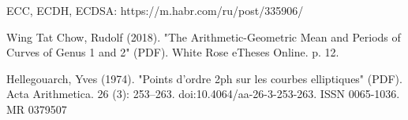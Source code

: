 \begin{thebibliography}{99}

ECC, ECDH, ECDSA: https://m.habr.com/ru/post/335906/

 Wing Tat Chow, Rudolf (2018). "The Arithmetic-Geometric Mean and Periods of Curves of Genus 1 and 2" (PDF). White Rose eTheses Online. p. 12.

Hellegouarch, Yves (1974). "Points d'ordre 2ph sur les courbes elliptiques" (PDF). Acta Arithmetica. 26 (3): 253–263. doi:10.4064/aa-26-3-253-263. ISSN 0065-1036. MR 0379507

\end{thebibliography}